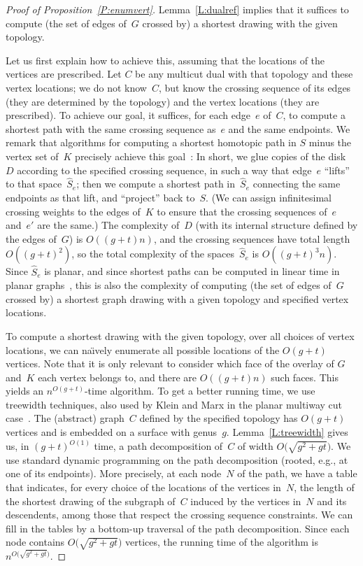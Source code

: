 \documentclass[11pt]{article}
\theoremstyle{plain}  \newtheorem{theorem}{Theorem}[section]
\theoremstyle{definition}
\begin{document}
\begin{proof}[Proof of Proposition~\ref{P:enumvert}]
  Lemma~\ref{L:dualref} implies that it suffices to compute (the set of
  edges of~$G$ crossed by) a shortest drawing with the given topology.  

  Let us first explain how to achieve this, assuming that the locations of
  the vertices are prescribed.  Let $C$ be any multicut dual with that
  topology and these vertex locations; we do not know~$C$, but know the
  crossing sequence of its edges (they are determined by the topology) and
  the vertex locations (they are prescribed).  To achieve our goal, it
  suffices, for each edge~$e$ of~$C$, to compute a shortest path with the
  same crossing sequence as~$e$ and the same endpoints.  We remark that
  algorithms for computing a shortest homotopic path in $S$ minus the
  vertex set of~$K$ precisely achieve this goal~\cite{ce-tnpcs-10}: In
  short, we glue copies of the disk~$D$ according to the specified crossing
  sequence, in such a way that edge~$e$ ``lifts'' to that space~$\hat S_e$;
  then we compute a shortest path in~$\hat S_e$ connecting the same
  endpoints as that lift, and ``project'' back to~$S$.  (We can assign
  infinitesimal crossing weights to the edges of~$K$ to ensure that the
  crossing sequences of~$e$ and~$e'$ are the same.)  The complexity of~$D$
  (with its internal structure defined by the edges of~$G$) is $O((g+t)n)$,
  and the crossing sequences have total length $O((g+t)^2)$, so the total
  complexity of the spaces~$\hat S_e$ is $O((g+t)^3n)$.  Since $\hat S_e$
  is planar, and since shortest paths can be computed in linear time in
  planar graphs~\cite{hkrs-fspap-97}, this is also the complexity of
  computing (the set of edges of~$G$ crossed by) a shortest graph drawing
  with a given topology and specified vertex locations.

  To compute a shortest drawing with the given topology, over all choices
  of vertex locations, we can na\"\i{}vely enumerate all possible locations
  of the $O(g+t)$ vertices.  Note that it is only relevant to consider
  which face of the overlay of $G$ and~$K$ each vertex belongs to, and
  there are $O((g+t)n)$ such faces.  This yields an
  $n^{O(g+t)}$-time algorithm.  To get a better running time,
  we use treewidth techniques, also used by Klein and Marx in the planar
  multiway cut case~\cite{km-spktc-12}.  The (abstract) graph~$C$ defined
  by the specified topology has $O(g+t)$ vertices and is embedded on a
  surface with genus~$g$.  Lemma~\ref{L:treewidth} gives us, in
  $(g+t)^{O(1)}$ time, a path decomposition of~$C$ of width
  $O\big(\sqrt{g^2+gt}\big)$.  We use standard dynamic programming on the
  path decomposition (rooted, e.g., at one of its endpoints).  More
  precisely, at each node~$N$ of the path, we have a table that indicates,
  for every choice of the locations of the vertices in~$N$, the length of
  the shortest drawing of the subgraph of~$C$ induced by the vertices
  in~$N$ and its descendents, among those that respect the crossing
  sequence constraints.  We can fill in the tables by a bottom-up traversal
  of the path decomposition.  Since each node contains
  $O\big(\sqrt{g^2+gt}\big)$ vertices, the running time of the algorithm is
  $n^{O\big(\sqrt{g^2+gt}\big)}$.
\end{proof}
\end{document}
